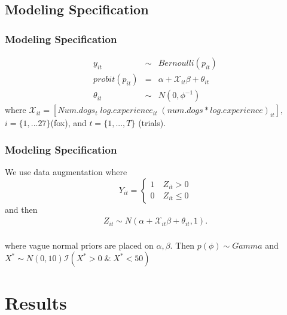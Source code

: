 \documentclass{beamer}
\begin{document}
\subsection{Modeling Specification}
\begin{frame}
	\frametitle{Modeling Specification}
\begin{eqnarray}
y_{it} &\sim& Bernoulli(p_{it}) \\
probit(p_{it}) & = & \alpha + \mathcal{X}_{it}\beta+ \theta_{it} \\
\theta_{it} &\sim& N(0, \phi^{-1})
\end{eqnarray}
where $\mathcal{X}_{it} = [Num.dogs_t\; log.experience_{it}\; (num.dogs*log.experience)_{it}],$ $i = \{1,...27\} $(fox), and $t= \{1,...,T\}$ (trials). %
 \end{frame}
\begin{frame}
	\frametitle{Modeling Specification}
	 We use data augmentation where 
	 \[
    Y_{it}=\left\{
                \begin{array}{ll}
                  1 \quad  Z_{it} > 0\\
                  0 \quad Z_{it} \leq 0
                \end{array}
              \right.
  \]
and then
  \begin{eqnarray}
  Z_{it} \sim N( \alpha + \mathcal{X}_{it}\beta +\theta_{it},1).
  \end{eqnarray}
\\
where vague normal priors are placed on $\alpha, \beta$. Then $p(\phi) \sim Gamma$ and $X^{*} \sim N(0,10) \mathcal{I}(X^* > 0 \;\&\; X^* < 50)$ 
\end{frame}
\section{Results}
\end{document}
